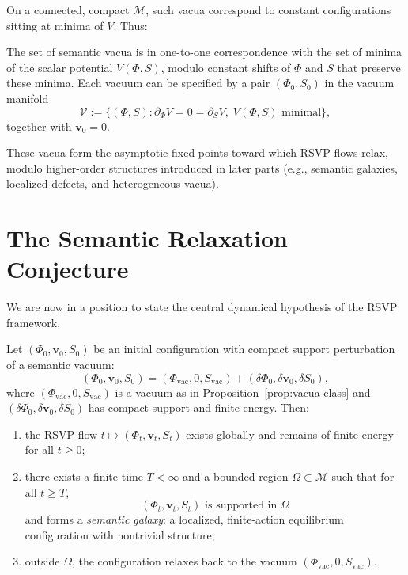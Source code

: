 On a connected, compact $\mathcal{M}$, such vacua correspond to constant
configurations sitting at minima of $V$. Thus:

\begin{proposition}
\label{prop:vacua-class}
The set of semantic vacua is in one-to-one correspondence with the set of
minima of the scalar potential $V(\Phi,S)$, modulo constant shifts of $\Phi$
and $S$ that preserve these minima.  
Each vacuum can be specified by a pair $(\Phi_0,S_0)$ in the vacuum manifold
\[
\mathcal{V} := \{(\Phi,S) : \partial_\Phi V = 0 = \partial_S V,\;
V(\Phi,S) \text{ minimal}\},
\]
together with $\mathbf{v}_0=0$.
\end{proposition}

These vacua form the asymptotic fixed points toward which RSVP flows relax,
modulo higher-order structures introduced in later parts (e.g., semantic
galaxies, localized defects, and heterogeneous vacua).

\section{The Semantic Relaxation Conjecture}

We are now in a position to state the central dynamical hypothesis of the RSVP
framework.

\begin{conjecture}
\label{conj:semantic-relaxation}
Let $(\Phi_0,\mathbf{v}_0,S_0)$ be an initial configuration with compact
support perturbation of a semantic vacuum:
\[
(\Phi_0,\mathbf{v}_0,S_0) = (\Phi_\mathrm{vac}, 0, S_\mathrm{vac})
 + (\delta\Phi_0,\delta\mathbf{v}_0,\delta S_0),
\]
where $(\Phi_\mathrm{vac},0,S_\mathrm{vac})$ is a vacuum as in
Proposition~\ref{prop:vacua-class} and
$(\delta\Phi_0,\delta\mathbf{v}_0,\delta S_0)$ has compact support and finite
energy. Then:
\begin{enumerate}
  \item the RSVP flow $t\mapsto(\Phi_t,\mathbf{v}_t,S_t)$ exists globally and
        remains of finite energy for all $t\ge 0$;
  \item there exists a finite time $T<\infty$ and a bounded region
        $\Omega\subset\mathcal{M}$ such that for all $t\ge T$,
        \[
        (\Phi_t,\mathbf{v}_t,S_t)
        \text{ is supported in } \Omega
        \]
        and forms a \emph{semantic galaxy}: a localized, finite-action
        equilibrium configuration with nontrivial structure;
  \item outside $\Omega$, the configuration relaxes back to the vacuum
        $(\Phi_\mathrm{vac},0,S_\mathrm{vac})$.
\end{enumerate}
\end{conjecture}

